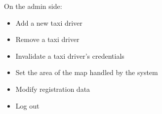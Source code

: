 \documentclass{article}
\begin{document}
On the admin side:\@
		\begin{itemize}
			\item Add a new taxi driver
			\item Remove a taxi driver
			\item Invalidate a taxi driver's credentials %
			\item Set the area of the map handled by the system %
			\item Modify registration data
			\item Log out
		\end{itemize}
\end{document}
